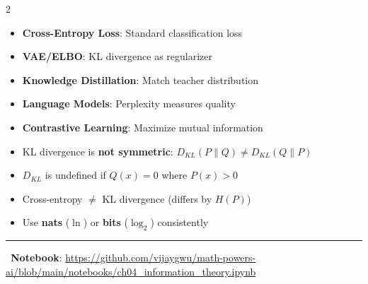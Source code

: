 \documentclass[11pt,letterpaper]{article}
\begin{document}
\begin{multicols}{2}
\begin{center}
\end{center}

\begin{tcolorbox}[appbox, title={\faRobot\ ML Applications}]
\begin{itemize}
    \item \textbf{Cross-Entropy Loss}: Standard classification loss
    \item \textbf{VAE/ELBO}: KL divergence as regularizer
    \item \textbf{Knowledge Distillation}: Match teacher distribution
    \item \textbf{Language Models}: Perplexity measures quality
    \item \textbf{Contrastive Learning}: Maximize mutual information
\end{itemize}
\end{tcolorbox}

\begin{tcolorbox}[warningbox, title={\faExclamationTriangle\ Common Pitfalls}]
\begin{itemize}
    \item KL divergence is \textbf{not symmetric}: $D_{KL}(P\|Q) \neq D_{KL}(Q\|P)$
    \item $D_{KL}$ is undefined if $Q(x)=0$ where $P(x)>0$
    \item Cross-entropy $\neq$ KL divergence (differs by $H(P)$)
    \item Use \textbf{nats} ($\ln$) or \textbf{bits} ($\log_2$) consistently
\end{itemize}
\end{tcolorbox}

\end{multicols}

\vspace{5pt}
\hrule
\vspace{5pt}

\begin{center}
\faGithub\ \textbf{Notebook}: \url{https://github.com/vijaygwu/math-powers-ai/blob/main/notebooks/ch04_information_theory.ipynb}
\end{center}
\end{document}
